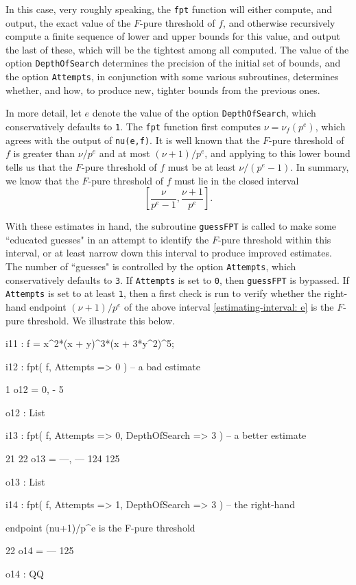 \documentclass{amsart}
\begin{document}
In this case, very roughly speaking, the {\tt fpt} function will either compute, and output, the exact value of the $F$-pure threshold of $f$, and otherwise recursively compute a finite sequence of lower and upper bounds for this value, and output the last of these, which will be the tightest among all computed.  The value of the option {\tt DepthOfSearch} determines the precision of the initial set of bounds, and the option {\tt Attempts}, in conjunction with some various subroutines, determines whether, and how, to produce new, tighter bounds from the previous ones.

In more detail, let $e$ denote the value of the option {\tt DepthOfSearch}, which conservatively defaults to {\tt 1}.  The {\tt fpt} function first computes $\nu=\nu_f(p^e)$, which agrees with the output of {\tt nu(e,f)}.  It is well known that the $F$-pure threshold of $f$ is greater than $\nu/p^e$ and at most $(\nu+1)/p^e$, and applying  \cite[Proposition 4.2]{HernandezFPurityOfHypersurfaces} to this lower bound tells us that the $F$-pure threshold of $f$ must be at least $\nu/(p^e-1)$.  In summary, we know that the $F$-pure threshold of $f$ must lie in the closed interval
%
\begin{equation}
\label{estimating-interval: e}
\tag{$\dagger$}
\left[ \frac{\nu}{p^e-1}, \frac{\nu+1}{p^e} \right].
\end{equation}

With these estimates in hand, the subroutine {\tt guessFPT} is called to make some ``educated guesses" in an attempt to identify the $F$-pure threshold within this interval, or at least narrow down this interval to produce improved estimates.  The number of ``guesses" is controlled by the option {\tt Attempts}, which conservatively defaults to {\tt 3}.  If {\tt Attempts} is set to {\tt 0}, then {\tt guessFPT} is bypassed. If  {\tt Attempts} is set to at least {\tt 1}, then a first check is run to verify whether the right-hand endpoint $(\nu+1)/p^e$ of the above interval \eqref{estimating-interval: e} is the $F$-pure threshold.  We illustrate this below.

{\small
{}
\begin{MyVerbatim}

i11 : f = x^2*(x + y)^3*(x + 3*y^2)^5;

i12 : fpt( f, Attempts => 0 ) -- a bad estimate

          1
o12 = {0, -}
          5

o12 : List

i13 : fpt( f, Attempts => 0, DepthOfSearch => 3 ) -- a better estimate

        21   22
o13 = {---, ---}
       124  125

o13 : List

i14 : fpt( f, Attempts => 1, DepthOfSearch => 3 ) -- the right-hand

      endpoint (nu+1)/p^e is the F-pure threshold

       22
o14 = ---
      125

o14 : QQ

\end{MyVerbatim}
}
\end{document}
